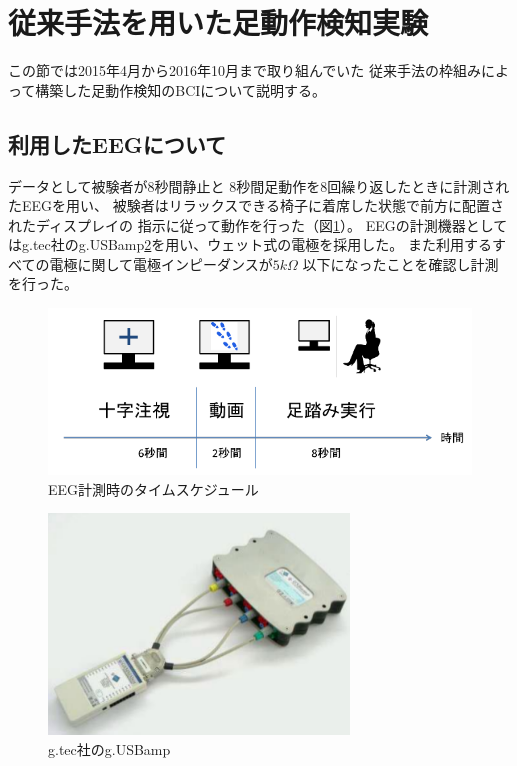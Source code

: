 \section{従来手法を用いた足動作検知実験}
この節では2015年4月から2016年10月まで取り組んでいた
従来手法の枠組みによって構築した足動作検知のBCIについて説明する。
\subsection{利用したEEGについて}
データとして被験者が8秒間静止と
8秒間足動作を8回繰り返したときに計測されたEEGを用い、
被験者はリラックスできる椅子に着席した状態で前方に配置されたディスプレイの
指示に従って動作を行った（図\ref{fig:asibumi}）。
EEGの計測機器としてはg.tec社のg.USBamp\ref{fig:usbamp}を用い、ウェット式の電極を採用した。
また利用するすべての電極に関して電極インピーダンスが\(5k\Omega\)
以下になったことを確認し計測を行った。
\begin{figure}
    \centering
    \includegraphics[width=13cm]{images/asibumi.png}
    \caption{EEG計測時のタイムスケジュール}
    \label{fig:asibumi}
\end{figure}
\begin{figure}
    \centering
    \includegraphics[width=8cm]{images/usbamp.png}
    \caption{g.tec社のg.USBamp}
    \label{fig:usbamp}
\end{figure}
